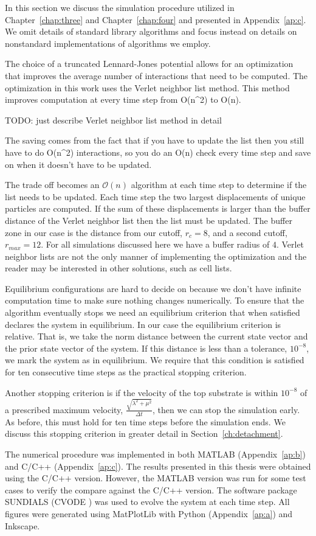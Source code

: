    In this section we discuss the simulation procedure utilized in Chapter~\ref{chap:three} and Chapter~\ref{chap:four} and presented in Appendix~\ref{ap:c}. We omit details of standard library algorithms and focus instead on details on nonstandard implementations of algorithms we employ.

   The choice of a truncated Lennard-Jones potential allows for an optimization that improves the average number of interactions that need to be computed. The optimization in this work uses the Verlet neighbor list method. This method improves computation at every time step from O(n^2) to O(n). 
   
   TODO: just describe Verlet neighbor list method in detail
   
   The saving comes from the fact that if you have to update the list then you still have to do O(n^2) interactions, so you do an O(n) check every time step and save on when it doesn't have to be updated.
   
   
   The trade off becomes an $\mathcal{O}(n)$ algorithm at each time step to determine if the list needs to be updated. Each time step the two largest displacements of unique particles are computed. If the sum of these displacements is larger than the buffer distance of the Verlet neighbor list then the list must be updated. The buffer zone in our case is the distance from our cutoff, $r_c = 8$, and a second cutoff, $r_{max} = 12$. For all simulations discussed here we have a buffer radius of $4$. Verlet neighbor lists are not the only manner of implementing the optimization and the reader may be interested in other solutions, such as cell lists.

   Equilibrium configurations are hard to decide on because we don't have infinite computation time to make sure nothing changes numerically. To ensure that the algorithm eventually stops we need an equilibrium criterion that when satisfied declares the system in equilibrium. In our case the equilibrium criterion is relative. That is, we take the norm distance between the current state vector and the prior state vector of the system. If this distance is less than a tolerance, $10^{-8}$, we mark the system as in equilibrium. We require that this condition is satisfied for ten consecutive time steps as the practical stopping criterion.
   
   Another stopping criterion is if the velocity of the top substrate is within $10^{-8}$ of a prescribed maximum velocity, $\frac{\sqrt{\lambda^2 + \mu^2}}{\Delta t}$, then we can stop the simulation early. As before, this must hold for ten time steps before the simulation ends. We discuss this stopping criterion in greater detail in Section~\ref{ch:detachment}.
   
   The numerical procedure was implemented in both MATLAB \cite{MATLAB2010} (Appendix~\ref{ap:b}) and C/C++ (Appendix~\ref{ap:c}). The results presented in this thesis were obtained using the C/C++ version. However, the MATLAB version was run for some test cases to verify the compare against the C/C++ version. The software package SUNDIALS (CVODE \cite{sundials}) was used to evolve the system at each time step. All figures were generated using MatPlotLib \cite{Hunter2007} with Python (Appendix~\ref{ap:a}) and Inkscape.
